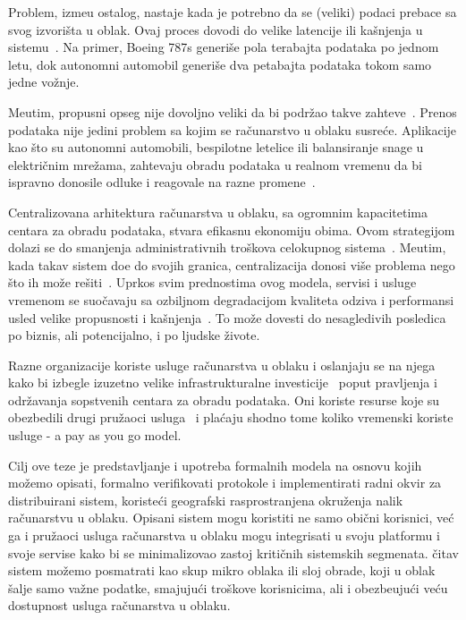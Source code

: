 Problem, izme\dj u ostalog, nastaje kada je potrebno da se (veliki) podaci prebace sa svog izvori\v sta u oblak. Ovaj proces dovodi do velike latencije ili ka\v snjenja u sistemu~\cite {HossainRH18}. Na primer, Boeing 787s generi\v se pola terabajta podataka po jednom letu, dok autonomni automobil generi\v se dva petabajta podataka tokom samo jedne vo\v znje. 

Me\dj utim, propusni opseg nije dovoljno veliki da bi podr\v zao takve zahteve~\cite{CaoZS18}. Prenos podataka nije jedini problem sa kojim se ra\v cunarstvo u oblaku susre\'ce. Aplikacije kao \v sto su autonomni automobili, bespilotne letelice ili balansiranje snage u elektri\v cnim mre\v zama, zahtevaju obradu podataka u realnom vremenu da bi ispravno donosile odluke i reagovale na razne promene~\cite{CaoZS18}.

Centralizovana arhitektura ra\v cunarstva u oblaku, sa ogromnim kapacitetima centara za obradu podataka, stvara efikasnu ekonomiju obima. Ovom strategijom dolazi se do smanjenja administrativnih tro\v skova celokupnog sistema~\cite{BariBEGPRZZ13}. Me\dj utim, kada takav sistem do\dj e do svojih granica, centralizacija donosi vi\v se problema nego \v sto ih mo\v ze re\v siti~\cite{GunawiHSLSAE16, LopezMEDHIBFR15}. Uprkos svim prednostima ovog modela, servisi i usluge vremenom se suo\v cavaju sa ozbiljnom degradacijom kvaliteta odziva i performansi usled velike propusnosti i ka\v snjenja~\cite {KarimIWGSYO16}. To mo\v ze dovesti do nesagledivih posledica po biznis, ali potencijalno, i po ljudske \v zivote. 

Razne organizacije koriste usluge ra\v cunarstva u oblaku i oslanjaju se na njega kako bi izbegle izuzetno velike infrastrukturalne investicije~\cite {MonsalveCC18} poput pravljenja i odr\v zavanja sopstvenih centara za obradu podataka. Oni koriste resurse koje su obezbedili drugi pru\v zaoci usluga~\cite{Satyanarayanan17} i pla\'caju shodno tome koliko vremenski koriste usluge - a pay as you go model.

Cilj ove teze je predstavljanje i upotreba formalnih modela na osnovu kojih mo\v zemo opisati, formalno verifikovati protokole i implementirati radni okvir za distribuirani sistem, koriste\'ci geografski rasprostranjena okru\v zenja nalik ra\v cunarstvu u oblaku. Opisani sistem mogu koristiti ne samo obi\v cni korisnici, ve\'c ga i pru\v zaoci usluga ra\v cunarstva u oblaku mogu integrisati u svoju platformu i svoje servise kako bi se minimalizovao zastoj kriti\v cnih sistemskih segmenata. \v citav sistem mo\v zemo posmatrati kao skup mikro oblaka ili sloj obrade, koji u oblak \v salje samo va\v zne podatke, smajuju\'ci tro\v skove korisnicima, ali i obezbe\dj uju\'ci ve\'cu dostupnost usluga ra\v cunarstva u oblaku.

